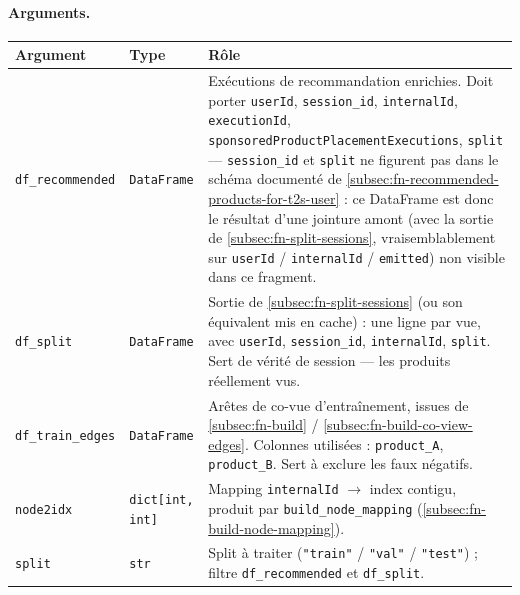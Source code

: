 \documentclass[11pt,a4paper]{article}
\newcommand{\code}[1]{\texttt{\small #1}}
\begin{document}
\paragraph{Arguments.}
\begin{center}
\small
\begin{tabular}{@{}llp{7.6cm}@{}}
\toprule
\textbf{Argument} & \textbf{Type} & \textbf{Rôle} \\
\midrule
\code{df\_recommended} & \code{DataFrame} & Exécutions de recommandation
  enrichies. Doit porter \code{userId}, \code{session\_id}, \code{internalId},
  \code{executionId}, \code{sponsoredProductPlacementExecutions},
  \code{split} --- \code{session\_id} et \code{split} ne figurent pas dans le
  schéma documenté de \ref{subsec:fn-recommended-products-for-t2s-user} : ce
  DataFrame est donc le résultat d'une jointure amont (avec la sortie de
  \ref{subsec:fn-split-sessions}, vraisemblablement sur \code{userId} /
  \code{internalId} / \code{emitted}) non visible dans ce fragment. \\
\code{df\_split} & \code{DataFrame} & Sortie de \ref{subsec:fn-split-sessions}
  (ou son équivalent mis en cache) : une ligne par vue, avec \code{userId},
  \code{session\_id}, \code{internalId}, \code{split}. Sert de vérité de
  session --- les produits réellement vus. \\
\code{df\_train\_edges} & \code{DataFrame} & Arêtes de co-vue d'entraînement,
  issues de \ref{subsec:fn-build} / \ref{subsec:fn-build-co-view-edges}.
  Colonnes utilisées : \code{product\_A}, \code{product\_B}. Sert à exclure
  les faux négatifs. \\
\code{node2idx} & \code{dict[int, int]} & Mapping \code{internalId} $\to$
  index contigu, produit par \code{build\_node\_mapping}
  (\ref{subsec:fn-build-node-mapping}). \\
\code{split} & \code{str} & Split à traiter (\code{"train"} / \code{"val"} /
  \code{"test"}) ; filtre \code{df\_recommended} et \code{df\_split}. \\
\bottomrule
\end{tabular}
\end{center}
\end{document}
